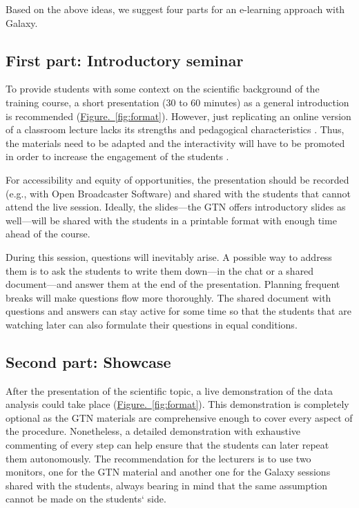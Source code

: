 Based on the above ideas, we suggest four parts for an e-learning approach with Galaxy.

\subsection*{First part: Introductory seminar}

To provide students with some context on the scientific background of the training course, a short presentation (30 to 60 minutes) as a general introduction is recommended (\hyperref[fig:format]{Figure.~\ref{fig:format}}). However, just replicating an online version of a classroom lecture lacks its strengths and pedagogical characteristics \cite{pratt2002lessons}. Thus, the materials need to be adapted and the interactivity will have to be promoted in order to increase the engagement of the students \cite{scagnoli2019students}.

For accessibility and equity of opportunities, the presentation should be recorded (e.g., with Open Broadcaster Software) and shared with the students that cannot attend the live session. Ideally, the slides—the GTN offers introductory slides as well—will be shared with the students in a printable format with enough time ahead of the course.

During this session, questions will inevitably arise. A possible way to address them is to ask the students to write them down—in the chat or a shared document—and answer them at the end of the presentation. Planning frequent breaks will make questions flow more thoroughly. The shared document with questions and answers can stay active for some time so that the students that are watching later can also formulate their questions in equal conditions.

\subsection*{Second part: Showcase}

After the presentation of the scientific topic, a live demonstration of the data analysis could take place (\hyperref[fig:format]{Figure.~\ref{fig:format}}). This demonstration is completely optional as the GTN materials are comprehensive enough to cover every aspect of the procedure. Nonetheless, a detailed demonstration with exhaustive commenting of every step can help ensure that the students can later repeat them autonomously. The recommendation for the lecturers is to use two monitors, one for the GTN material and another one for the Galaxy sessions shared with the students, always bearing in mind that the same assumption cannot be made on the students` side.


